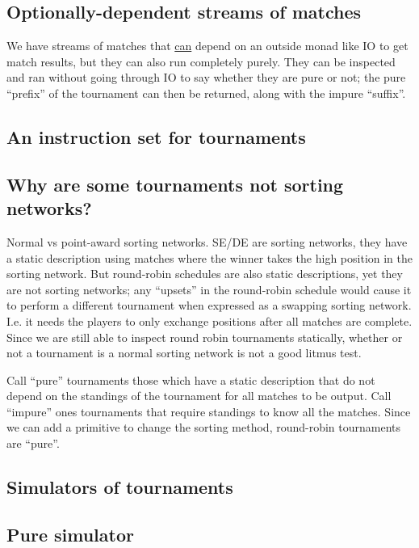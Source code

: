 \documentclass[a4,11pt,twoside,final]{article}
\begin{document}
\subsection{Optionally-dependent streams of matches}
\label{sec:org76342a0}
We have streams of matches that \uline{can} depend on an outside monad like IO to get
match results, but they can also run completely purely. They can be inspected
and ran without going through IO to say whether they are pure or not; the pure
``prefix'' of the tournament can then be returned, along with the impure ``suffix''.

\subsection{An instruction set for tournaments}
\label{sec:org821c6a6}

\subsection{Why are some tournaments not sorting networks?}
\label{sec:org4439004}
Normal vs point-award sorting networks. SE/DE are sorting networks, they have a
static description using matches where the winner takes the high position in the
sorting network. But round-robin schedules are also static descriptions, yet
they are not sorting networks; any ``upsets'' in the round-robin schedule would
cause it to perform a different tournament when expressed as a swapping sorting
network. I.e. it needs the players to only exchange positions after all matches
are complete. Since we are still able to inspect round robin tournaments
statically, whether or not a tournament is a normal sorting network is not a
good litmus test.

Call ``pure'' tournaments those which have a static description that do not depend
on the standings of the tournament for all matches to be output. Call ``impure''
ones tournaments that require standings to know all the matches. Since we can
add a primitive to change the sorting method, round-robin tournaments are ``pure''.

\subsection{Simulators of tournaments}
\label{sec:org8352686}
\subsection{Pure simulator}
\label{sec:org85da12f}
\end{document}

